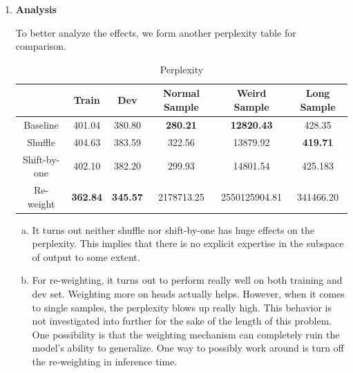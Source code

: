 \documentclass{article}
\newenvironment{solution}{\color{blue}}{}
\begin{document}
\begin{solution}
\begin{enumerate}
    \item \textbf{Analysis}
    
    To better analyze the effects, we form another perplexity table for comparison.

    \begin{table}[!htbp]
      \caption{Perplexity}
      \begin{center}
        \begin{tabular}{| c | c | c | c | c | c |}
          \hline
          & Train & Dev & Normal Sample & Weird Sample & Long Sample \\ \hline
          Baseline & 401.04 & 380.80 & \textbf{280.21} & \textbf{12820.43} & 428.35 \\ \hline
          Shuffle & 404.63 & 383.59 & 322.56 & 13879.92 & \textbf{419.71}  \\ \hline
          Shift-by-one & 402.10 & 382.20 & 299.93 & 14801.54 & 425.183 \\ \hline
          Re-weight & \textbf{362.84} & \textbf{345.57} & 2178713.25 & 2550125904.81 & 341466.20 \\ \hline
        \end{tabular}
      \end{center}
    \end{table}

    \begin{solution}
      \begin{enumerate}[(a)]
        \item It turns out neither shuffle nor shift-by-one has huge effects on the perplexity. This implies that there is no explicit expertise in the subspace of output to some extent.
        \item For re-weighting, it turns out to perform really well on both training and dev set. Weighting more on heads actually helps. However, when it comes to single samples, the perplexity blows up really high. This behavior is not investigated into further for the sake of the length of this problem. One possibility is that the weighting mechanism can completely ruin the model's ability to generalize. One way to possibly work around is turn off the re-weighting in inference time.
      \end{enumerate}
    \end{solution}

  \end{enumerate}
\end{solution}

\newpage
\end{document}
